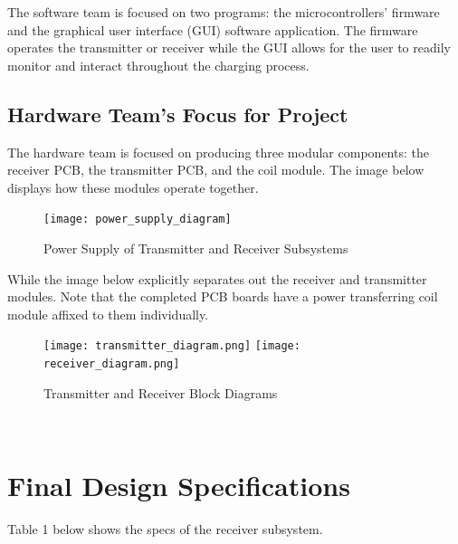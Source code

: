 \documentclass[12pt]{article}
\begin{document}
\indent \indent
The software team is focused on two programs: the microcontrollers' firmware and the graphical user interface (GUI) software application.  The firmware operates the transmitter or receiver while the GUI allows for the user to readily monitor and interact throughout the charging process.

\hfill
\pagebreak
\hfill

\subsection{Hardware Team's Focus for Project}

\indent \indent
The hardware team is focused on producing three modular components: the receiver PCB, the transmitter PCB, and the coil module.  The image below displays how these modules operate together.


\begin{figure}[h!]
\texttt{[image: power\_supply\_diagram]}
\caption{Power Supply of Transmitter and Receiver Subsystems}
\end{figure}
\indent
While the image below explicitly separates out the receiver and transmitter modules.  Note that the completed PCB boards have a power transferring coil module affixed to them individually.
\begin{figure}[h!]
\centering
\texttt{[image: transmitter\_diagram.png]}
\texttt{[image: receiver\_diagram.png]}
\caption{Transmitter and Receiver Block Diagrams}
\end{figure}
\hfill \\


\hfill 
\pagebreak
\hfill

\section{Final Design Specifications}

\indent
Table 1 below shows the specs of the receiver subsystem.
\hfill





\end{document}
